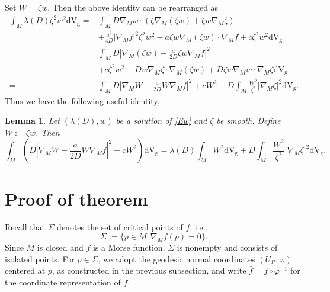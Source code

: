 \documentclass[12pt,reqno]{amsart}
\newtheorem{lemma}{Lemma}[section]
\newcommand{\V}{\mathrm{d} \mathrm{V_g}}
\numberwithin{equation}{section}
\begin{document}
Set $W = \zeta w$. Then the above identity can be rearranged as
\[ \begin{aligned}
     \int_{M} \lambda (D) \zeta^2 w^2 \V =& \int_{M} D \nabla_M w \cdot
     (\zeta \nabla_M (\zeta w) + \zeta w \nabla_M \zeta)\\
     & + \frac{a^2}{4D}  | \nabla_M f|^2 \zeta^2 w^2 -  a \zeta w
     \nabla_M (\zeta w) \cdot \nabla_M f + c \zeta^2 w^2\mathrm{d} \mathrm{V_g}\\
     =&  \int_{M} D \left| \nabla_M (\zeta w) - \frac{a}{2D} \zeta w
     \nabla_M f \right|^2\\
     & + c \zeta^2 w^2 - Dw \nabla_M \zeta \cdot \nabla_M (\zeta w) + D \zeta w
     \nabla_M w \cdot \nabla_M \zeta\mathrm{d} \mathrm{V_g}\\
      =& \int_{M} D \left| \nabla_M W - \frac{a}{2D} W \nabla_M f
     \right|^2 + c W^2 - D \int_{M} \frac{W^2}{\zeta^2}  | \nabla_M \zeta
     |^2 \mathrm{d} \mathrm{V_g}.
   \end{aligned} \]
Thus we have the following useful identity.
\begin{lemma}\label{lem:2.2}
Let \((\lambda(D), w)\) be a solution of \eqref{Ew} and \(\zeta\) be smooth. Define \(W := \zeta w\). Then
\begin{equation}
\int_M \left( D \left| \nabla_M W - \frac{a}{2D} W \nabla_M f \right|^2 + c W^2 \right) \V =\! \lambda(D) \int_M W^2 \V + D \int_M \frac{W^2}{\zeta^2} |\nabla_M \zeta|^2 \V.
\end{equation}
\end{lemma}



\section{Proof of theorem}
Recall that \(\Sigma\) denotes the set of critical points of \(f\), i.e.,
\[
\Sigma := \{ p \in M : \nabla_M f(p) = 0 \}.
\]
Since \(M\) is closed and \(f\) is a Morse function, \(\Sigma\) is nonempty and consists of isolated points. For \(p\in\Sigma\), we adopt the geodesic normal coordinates \((U_R,\varphi)\) centered at \(p\), as constructed in the previous subsection, and write \(\hat f = f\circ\varphi^{-1}\) for the coordinate representation of \(f\).
\end{document}
